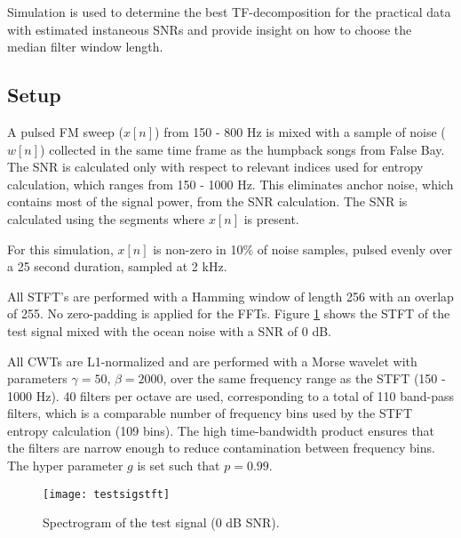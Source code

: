 Simulation is used to determine the best TF-decomposition for the practical data with estimated instaneous SNRs and provide insight on how to choose the median filter window length.

\subsection{Setup}
A pulsed FM sweep ($x[n]$) from 150 - 800 Hz is mixed with a sample of noise ($w[n]$) collected in the same time frame as the humpback songs from False Bay. The SNR is calculated only with respect to relevant indices used for entropy calculation, which ranges from 150 - 1000 Hz.  This eliminates anchor noise, which contains most of the signal power, from the SNR calculation. The SNR is calculated using the segments where $x[n]$ is present.
 
For this simulation, $x[n]$ is non-zero in 10\% of noise samples, pulsed evenly over a 25 second duration, sampled at 2 kHz. 
 
All STFT's are performed with a Hamming window of length 256 with an overlap of 255. No zero-padding is applied for the FFTs. Figure \ref{fig:testsigstft} shows the STFT of the test signal mixed with the ocean noise with a SNR of 0 dB.
 
 All CWTs are L1-normalized and are performed with a Morse wavelet with parameters $\gamma = 50$, $\beta = 2000$, over the same frequency range as the STFT (150 - 1000 Hz). 40 filters per octave are used, corresponding to a total of 110 band-pass filters, which is a comparable number of frequency bins used by the STFT entropy calculation (109 bins). The high time-bandwidth product ensures that the filters are narrow enough to reduce contamination between frequency bins. The hyper parameter $g$ is set such that $p = 0.99$. 
 
  \begin{figure}
 	\centering
 	\texttt{[image: testsigstft]}
 	\caption{Spectrogram of the test signal (0 dB SNR).}
 	\label{fig:testsigstft}
 \end{figure}
 

